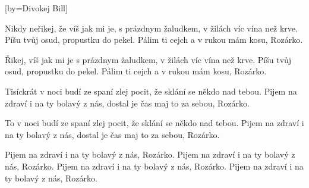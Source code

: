 [by={Divokej Bill}]

\beginverse{}
Nikdy neřikej, že víš jak mi je, s prázdnym
žaludkem, v žilách víc vína než krve.
Píšu tvůj osud, propustku do pekel.
Pálim ti cejch a v rukou mám kosu, Rozárko.
\endverse{}

\beginverse{}
Řikej, víš jak mi je s prázdnym
žaludkem, v žilách víc vína než krve.
Píšu tvůj osud, propustku do pekel.
Pálim ti cejch a v rukou mám kosu, Rozárko.
\endverse{}

\beginverse{}
Tisíckrát v noci budí ze spaní zlej
pocit, že sklání se někdo nad tebou.
Pijem na zdraví i na ty bolavý z nás,
dostal je čas maj to za sebou, Rozárko.
\endverse{}

\beginverse{}
To v noci budí ze spaní zlej
pocit, že sklání se někdo nad tebou.
Pijem na zdraví i na ty bolavý z nás,
dostal je čas maj to za sebou, Rozárko.
\endverse{}

\beginverse{}
Pijem na zdraví i na ty bolavý z nás, Rozárko.
Pijem na zdraví i na ty bolavý z nás, Rozárko.
Pijem na zdraví i na ty bolavý z nás, Rozárko.
Pijem na zdraví i na ty bolavý z nás, Rozárko.
\endverse{}

\endsong{}
